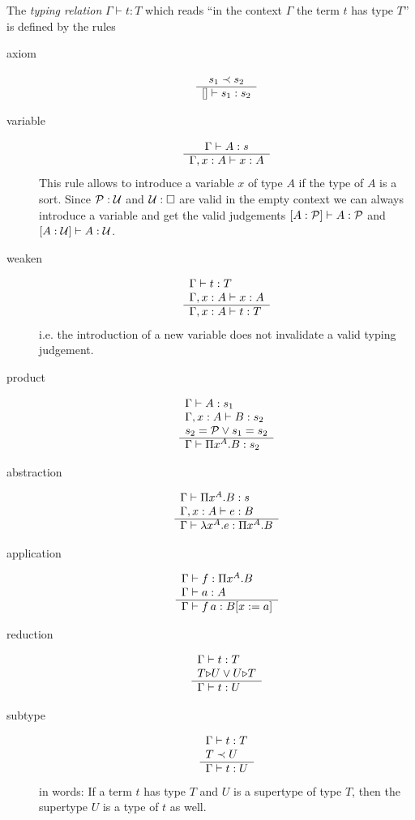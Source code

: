 \begin{definition}
  The \emph {typing relation} $\Gamma \vdash t:T$ which reads ``in the context
  $\Gamma$ the term $t$ has type $T$'' is defined by the rules
  \begin{description}
  \item[axiom]
    $$
    \begin{array}{c} s_1 \prec s_2 \\ \hline [] \vdash s_1 : s_2\end{array}
    $$

  \item[variable]
    $$
    \begin{array}{c} \Gamma \vdash A: s \\ \hline \Gamma, x:A \vdash x:A\end{array}
    $$
    This rule allows to introduce a variable $x$ of type $A$ if the type of
    $A$ is a sort. Since ${\cal{P}} : {\cal{U}}$ and ${\cal{U}} : \Box$ are valid in the
    empty context we can always introduce a variable and get the valid
    judgements $[A: {\cal{P}}] \vdash A : {\cal{P}}$ and $[A: {\cal{U}}] \vdash A : {\cal{U}}$.

  \item[weaken]
    $$
    \begin{array}{l} \Gamma \vdash t: T
      \\
      \Gamma, x:A \vdash x:A \\ \hline \Gamma, x:A \vdash t : T\end{array}
    $$
    i.e. the introduction of a new variable does not invalidate a valid typing
    judgement.

  \item[product]
    $$
    \begin{array}{l} \Gamma \vdash A: s_1
      \\
      \Gamma,x:A \vdash B:s_2
      \\
      s_2 = {\cal{P}} \lor s_1 = s_2
     \\ \hline \Gamma \vdash \Pi x^A . B: s_2\end{array}
    $$

  \item[abstraction]
    $$
    \begin{array}{l} \Gamma \vdash \Pi x^A . B: s
      \\
      \Gamma,x:A \vdash e:B
     \\ \hline \Gamma \vdash \lambda x^A . e : \Pi x^A . B\end{array}
    $$

  \item[application]
    $$
    \begin{array}{l} \Gamma \vdash f: \Pi x^A . B
      \\
      \Gamma \vdash a:A
     \\ \hline \Gamma \vdash f \, a : B[x:=a]\end{array}
    $$

  \item[reduction]
    $$
    \begin{array}{l} \Gamma \vdash t : T
      \\
      T {\mathrel{\triangleright}} U \lor U {\mathrel{\triangleright}} T
     \\ \hline \Gamma \vdash t: U\end{array}
    $$

  \item[subtype]
    $$
    \begin{array}{l} \Gamma \vdash t : T
      \\
      T \prec U
     \\ \hline \Gamma \vdash t: U\end{array}
    $$
    in words: If a term $t$ has type $T$ and $U$ is a supertype of type $T$,
    then the supertype $U$ is a type of $t$ as well.


\end{description}
\end{definition}
